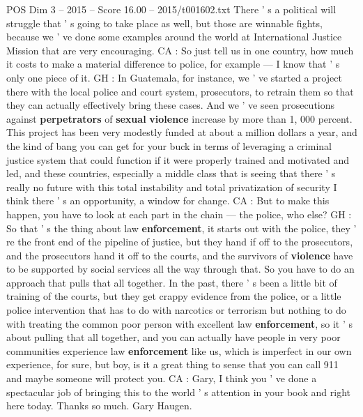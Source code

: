 \begin{textsample}{POS Dim 3 – 2015 – Score 16.00 – 2015/t001602.txt}
There ' s a political will struggle that ' s going to take place as well, but those are winnable fights, because we ' ve done some examples around the world at International Justice Mission that are very encouraging.
CA : So just tell us in one country, how much it costs to make a material difference to police, for example — I know that ' s only one piece of it.
GH : In Guatemala, for instance, we ' ve started a project there with the local police and court system, prosecutors, to retrain them so that they can actually effectively bring these cases.
And we ' ve seen prosecutions against \textbf{perpetrators} of \textbf{sexual} \textbf{violence} increase by more than 1, 000 percent.
This project has been very modestly funded at about a million dollars a year, and the kind of bang you can get for your buck in terms of leveraging a criminal justice system that could function if it were properly trained and motivated and led, and these countries, especially a middle class that is seeing that there ' s really no future with this total instability and total privatization of security I think there ' s an opportunity, a window for change.
CA : But to make this happen, you have to look at each part in the chain — the police, who else?
GH : So that ' s the thing about law \textbf{enforcement}, it starts out with the police, they ' re the front end of the pipeline of justice, but they hand if off to the prosecutors, and the prosecutors hand it off to the courts, and the survivors of \textbf{violence} have to be supported by social services all the way through that.
So you have to do an approach that pulls that all together.
In the past, there ' s been a little bit of training of the courts, but they get crappy evidence from the police, or a little police intervention that has to do with narcotics or terrorism but nothing to do with treating the common poor person with excellent law \textbf{enforcement}, so it ' s about pulling that all together, and you can actually have people in very poor communities experience law \textbf{enforcement} like us, which is imperfect in our own experience, for sure, but boy, is it a great thing to sense that you can call 911 and maybe someone will protect you.
CA : Gary, I think you ' ve done a spectacular job of bringing this to the world ' s attention in your book and right here today.
Thanks so much.
Gary Haugen.

\end{textsample}
